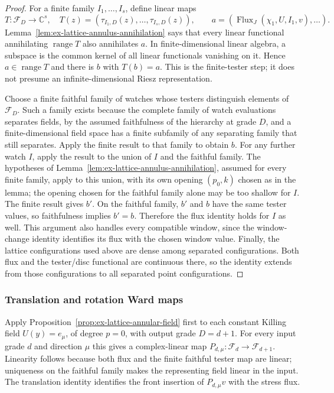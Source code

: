\begin{proof}
For a finite family $I_1,\ldots,I_s$, define linear maps
\[
  T:\mathcal F_D\to\mathbb C^s,
  \quad T(z)=(\tau_{I_1,D}(z),\ldots,\tau_{I_s,D}(z)),
  \qquad a=(\operatorname{Flux}_{J}(\chi_1,U,I_1,v),\ldots).
\]
Lemma~\ref{lem:ex-lattice-annulus-annihilation} says that every linear
functional annihilating $\operatorname{range}T$ also annihilates $a$.
In finite-dimensional linear algebra, a subspace is the common kernel of all
linear functionals vanishing on it.  Hence $a\in\operatorname{range}T$ and
there is $b$ with $T(b)=a$.  This is the finite-tester step; it does not presume an
infinite-dimensional Riesz representation.

Choose a finite faithful family of watches whose testers distinguish
elements of $\mathcal F_D$.  Such a family exists because the complete family
of watch evaluations separates fields, by the assumed faithfulness of the
hierarchy at grade $D$, and a finite-dimensional field space has a finite
subfamily of any separating family that still separates.  Apply
the finite result to that family to obtain
$b$.  For any further watch $I$, apply the result to the union of $I$ and the
faithful family.  The hypotheses of
Lemma~\ref{lem:ex-lattice-annulus-annihilation}, assumed for every finite
family, apply to this union, with its own opening $(p_0,k)$ chosen as in the
lemma; the opening chosen for the faithful family alone may be too shallow
for $I$.  The finite result gives $b'$.  On the faithful family, $b'$ and $b$ have
the same tester values, so faithfulness implies $b'=b$.  Therefore the flux
identity holds for $I$ as well.  This argument also handles every compatible
window, since the window-change identity identifies its flux with the chosen
window value.  Finally, the lattice configurations used above are dense
among separated configurations.  Both flux and the tester/disc functional
are continuous there, so the identity extends from those configurations to
all separated point configurations.\end{proof}

\subsubsection{Translation and rotation Ward maps}

Apply Proposition~\ref{prop:ex-lattice-annular-field} first to each constant
Killing field $U(y)=e_\mu$, of degree $p=0$, with output grade $D=d+1$.
For every input grade $d$ and direction $\mu$ this gives a complex-linear map
$P_{d,\mu}:\mathcal F_d\to\mathcal F_{d+1}$.  Linearity follows because
both flux and the finite faithful tester map are linear; uniqueness on the
faithful family makes the representing field linear in the input.  The
translation identity identifies the front insertion of $P_{d,\mu}v$ with
the stress flux.


